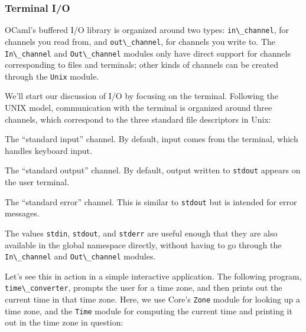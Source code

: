 \hypertarget{terminal-io}{%
\subsubsection{Terminal I/O}\label{terminal-io}}

OCaml's buffered I/O library is organized around two types:
\passthrough{\lstinline!in\_channel!}, for channels you read from, and
\passthrough{\lstinline!out\_channel!}, for channels you write to. The
\passthrough{\lstinline!In\_channel!} and
\passthrough{\lstinline!Out\_channel!} modules only have direct support
for channels corresponding to files and terminals; other kinds of
channels can be created through the \passthrough{\lstinline!Unix!}
module. 

We'll start our discussion of I/O by focusing on the terminal. Following
the UNIX model, communication with the terminal is organized around
three channels, which correspond to the three standard file descriptors
in Unix:

\begin{description}
\tightlist
\item[\texttt{In\_channel.stdin}]
The ``standard input'' channel. By default, input comes from the
terminal, which handles keyboard input.
\item[\texttt{Out\_channel.stdout}]
The ``standard output'' channel. By default, output written to
\passthrough{\lstinline!stdout!} appears on the user terminal.
\item[\texttt{Out\_channel.stderr}]
The ``standard error'' channel. This is similar to
\passthrough{\lstinline!stdout!} but is intended for error messages.
\end{description}

The values \passthrough{\lstinline!stdin!},
\passthrough{\lstinline!stdout!}, and \passthrough{\lstinline!stderr!}
are useful enough that they are also available in the global namespace
directly, without having to go through the
\passthrough{\lstinline!In\_channel!} and
\passthrough{\lstinline!Out\_channel!} modules.

Let's see this in action in a simple interactive application. The
following program, \passthrough{\lstinline!time\_converter!}, prompts
the user for a time zone, and then prints out the current time in that
time zone. Here, we use Core's \passthrough{\lstinline!Zone!} module for
looking up a time zone, and the \passthrough{\lstinline!Time!} module
for computing the current time and printing it out in the time zone in
question:

